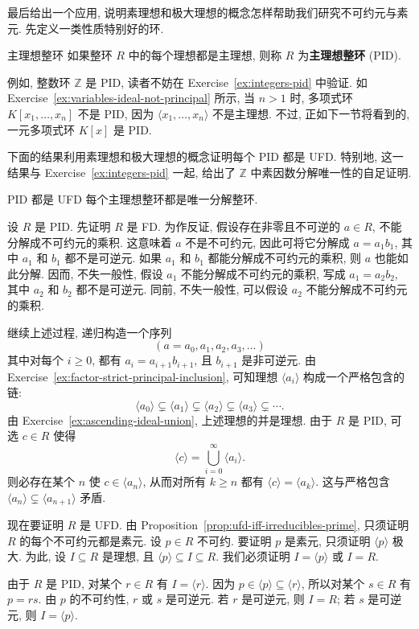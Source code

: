 最后给出一个应用, 说明素理想和极大理想的概念怎样帮助我们研究不可约元与素元. 先定义一类性质特别好的环.

\begin{Definition}{主理想整环}\label{def:principal-ideal-domain}
  如果整环 $R$ 中的每个理想都是主理想, 则称 $R$ 为\textbf{主理想整环} (PID).
\end{Definition}

例如, 整数环 $\mathbb{Z}$ 是 PID, 读者不妨在 Exercise~\ref{ex:integers-pid} 中验证. 如 Exercise~\ref{ex:variables-ideal-not-principal} 所示, 当 $n>1$ 时, 多项式环 $K[x_{1},\ldots,x_{n}]$ 不是 PID, 因为 $\langle x_{1},\ldots,x_{n}\rangle$ 不是主理想. 不过, 正如下一节将看到的, 一元多项式环 $K[x]$ 是 PID.

下面的结果利用素理想和极大理想的概念证明每个 PID 都是 UFD. 特别地, 这一结果与 Exercise~\ref{ex:integers-pid} 一起, 给出了 $\mathbb{Z}$ 中素因数分解唯一性的自足证明.

\begin{Proposition}{PID 都是 UFD}\label{prop:pid-is-ufd}
  每个主理想整环都是唯一分解整环.
\end{Proposition}

\begin{Proof}
  设 $R$ 是 PID. 先证明 $R$ 是 FD. 为作反证, 假设存在非零且不可逆的 $a\in R$, 不能分解成不可约元的乘积. 这意味着 $a$ 不是不可约元, 因此可将它分解成 $a=a_{1}b_{1}$, 其中 $a_{1}$ 和 $b_{1}$ 都不是可逆元. 如果 $a_{1}$ 和 $b_{1}$ 都能分解成不可约元的乘积, 则 $a$ 也能如此分解. 因而, 不失一般性, 假设 $a_{1}$ 不能分解成不可约元的乘积, 写成 $a_{1}=a_{2}b_{2}$, 其中 $a_{2}$ 和 $b_{2}$ 都不是可逆元. 同前, 不失一般性, 可以假设 $a_{2}$ 不能分解成不可约元的乘积.

  继续上述过程, 递归构造一个序列
  \[
    (a=a_{0},a_{1},a_{2},a_{3},\ldots)
  \]
  其中对每个 $i\ge0$, 都有 $a_{i}=a_{i+1}b_{i+1}$, 且 $b_{i+1}$ 是非可逆元. 由 Exercise~\ref{ex:factor-strict-principal-inclusion}, 可知理想 $\langle a_{i}\rangle$ 构成一个严格包含的链:
  \[
    \langle a_{0}\rangle\subsetneq\langle a_{1}\rangle\subsetneq\langle a_{2}\rangle\subsetneq\langle a_{3}\rangle\subsetneq\cdots.
  \]
  由 Exercise~\ref{ex:ascending-ideal-union}, 上述理想的并是理想. 由于 $R$ 是 PID, 可选 $c\in R$ 使得
  \[
    \langle c\rangle=\bigcup_{i=0}^{\infty}\langle a_{i}\rangle.
  \]
  则必存在某个 $n$ 使 $c\in\langle a_{n}\rangle$, 从而对所有 $k\ge n$ 都有 $\langle c\rangle=\langle a_{k}\rangle$. 这与严格包含 $\langle a_{n}\rangle\subsetneq\langle a_{n+1}\rangle$ 矛盾.

  现在要证明 $R$ 是 UFD. 由 Proposition~\ref{prop:ufd-iff-irreducibles-prime}, 只须证明 $R$ 的每个不可约元都是素元. 设 $p\in R$ 不可约. 要证明 $p$ 是素元, 只须证明 $\langle p\rangle$ 极大. 为此, 设 $I\subseteq R$ 是理想, 且 $\langle p\rangle\subseteq I\subseteq R$. 我们必须证明 $I=\langle p\rangle$ 或 $I=R$.

  由于 $R$ 是 PID, 对某个 $r\in R$ 有 $I=\langle r\rangle$. 因为 $p\in\langle p\rangle\subseteq\langle r\rangle$, 所以对某个 $s\in R$ 有 $p=rs$. 由 $p$ 的不可约性, $r$ 或 $s$ 是可逆元. 若 $r$ 是可逆元, 则 $I=R$; 若 $s$ 是可逆元, 则 $I=\langle p\rangle$.
\end{Proof}

